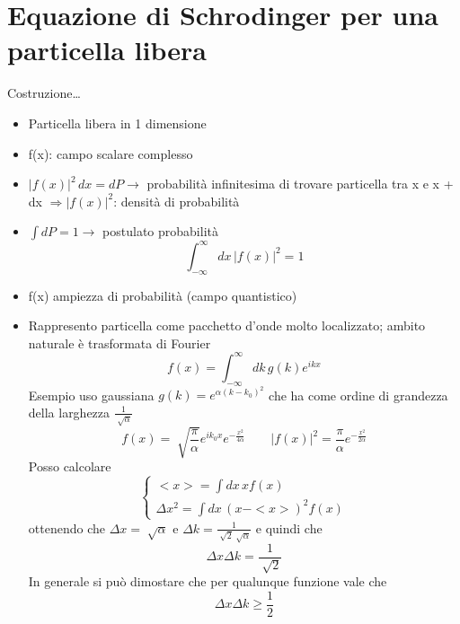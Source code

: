 \documentclass[a4paper,11pt]{report}
\theoremstyle{remark}
\theoremstyle{definition}
\begin{document}
\section{Equazione di Schrodinger per una particella libera}
Costruzione\dots
\begin{itemize}
    \item Particella libera in 1 dimensione
    \item f(x): campo scalare complesso
    \item ${|f(x)|}^2 \, dx = dP  \rightarrow$ probabilità infinitesima di trovare particella tra x e x + dx $\Rightarrow {|f(x)|}^2$: densità di probabilità
    \item $\int dP = 1 \rightarrow$ postulato probabilità
    \begin{equation*}
        \int_{-\infty}^\infty dx \, {|f(x)|}^2 =1 
    \end{equation*}
    \item f(x) ampiezza di probabilità (campo quantistico)
    \item Rappresento particella come pacchetto d'onde molto localizzato; ambito naturale è trasformata di Fourier
    \begin{equation*}
        f(x) = \int_{-\infty}^\infty dk \, g(k)e^{ikx}
    \end{equation*}
    Esempio uso gaussiana $g(k) = e^{\alpha{(k-k_0)}^2}$ che ha come ordine di grandezza della larghezza $\frac{1}{\sqrt[]{\alpha}}$
    \begin{equation*}
        f(x) = \sqrt[]{\frac{\pi}{\alpha}}e^{ik_0x}e^{-\frac{x^2}{4\alpha}} \qquad {|f(x)|}^2 = \frac{\pi}{\alpha} e^{-\frac{x^2}{2\alpha}}
    \end{equation*}
    Posso calcolare 
    \begin{equation*}
        \begin{cases}
            <x> = \int dx \, xf(x) \\
            \Delta x^2 = \int dx \, {(x-<x>)}^2f(x)
        \end{cases}
    \end{equation*}
    ottenendo che $\Delta x= \sqrt[]{\alpha}$ e $\Delta k = \frac{1}{\sqrt[]{2}\sqrt[]{\alpha}}$ e quindi che
    \begin{equation*}
        \Delta x \Delta k = \frac{1}{\sqrt[]{2}}
    \end{equation*}
    In generale si può dimostare che per qualunque funzione vale che 
    \begin{equation*}
        \Delta x \Delta k \geq \frac{1}{2}

\end{equation*}
\end{itemize}
\end{document}
